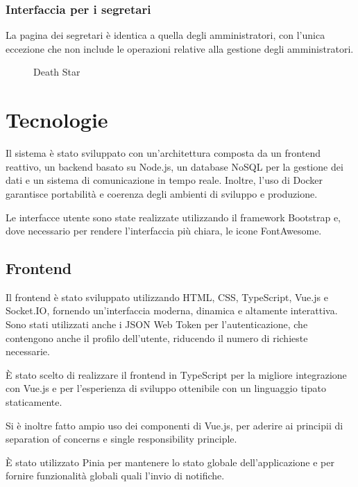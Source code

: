 \documentclass{report}
\begin{document}
\subsubsection{Interfaccia per i segretari}
\par La pagina dei segretari è identica a quella degli amministratori, con l'unica eccezione che non include le operazioni relative alla gestione degli amministratori.

\begin{figure}[h!]
\centering
\caption{Death Star}
\label{fig:deathstar}
\end{figure}

\section{Tecnologie}
\par Il sistema è stato sviluppato con un'architettura composta da un frontend reattivo, un backend basato su Node.js, un database NoSQL per la gestione dei dati e un sistema di comunicazione in tempo reale. Inoltre, l'uso di Docker garantisce portabilità e coerenza degli ambienti di sviluppo e produzione.
\par Le interfacce utente sono state realizzate utilizzando il framework Bootstrap e, dove necessario per rendere l'interfaccia più chiara, le icone FontAwesome.
\subsection{Frontend}
\par Il frontend è stato sviluppato utilizzando HTML, CSS, TypeScript, Vue.js e Socket.IO, fornendo un'interfaccia moderna, dinamica e altamente interattiva. Sono stati utilizzati anche i JSON Web Token \citep{rfc7519} per l'autenticazione, che contengono anche il profilo dell'utente, riducendo il numero di richieste necessarie.
\par È stato scelto di realizzare il frontend in TypeScript per la migliore integrazione con Vue.js e per l'esperienza di sviluppo ottenibile con un linguaggio tipato staticamente.
\par Si è inoltre fatto ampio uso dei componenti di Vue.js, per aderire ai principii di separation of concerns e single responsibility principle.
\par È stato utilizzato Pinia per mantenere lo stato globale dell'applicazione e per fornire funzionalità globali quali l'invio di notifiche.
\end{document}
